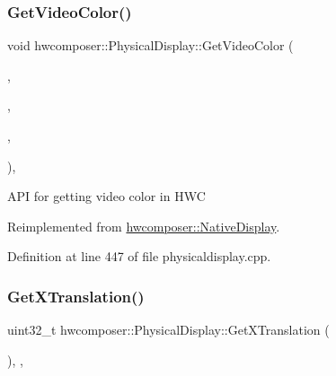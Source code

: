 \subsubsection{\texorpdfstring{Get\+Video\+Color()}{GetVideoColor()}}
{\footnotesize\ttfamily void hwcomposer\+::\+Physical\+Display\+::\+Get\+Video\+Color (\begin{DoxyParamCaption}\item[{H\+W\+C\+Color\+Control}]{,  }\item[{float $\ast$}]{,  }\item[{float $\ast$}]{,  }\item[{float $\ast$}]{ }\end{DoxyParamCaption})\hspace{0.3cm}{\ttfamily [override]}, {\ttfamily [virtual]}}

A\+PI for getting video color in H\+WC 

Reimplemented from \mbox{\hyperlink{classhwcomposer_1_1NativeDisplay_a2db52a8a234064113a0e250a059663ac}{hwcomposer\+::\+Native\+Display}}.



Definition at line 447 of file physicaldisplay.\+cpp.


\begin{DoxyCode}{0}
\end{DoxyCode}
\mbox{\label{classhwcomposer_1_1PhysicalDisplay_a6ed8f896bdb7adc6a20bf25c3fe41f8f}} 
\subsubsection{\texorpdfstring{Get\+X\+Translation()}{GetXTranslation()}}
{\footnotesize\ttfamily uint32\+\_\+t hwcomposer\+::\+Physical\+Display\+::\+Get\+X\+Translation (\begin{DoxyParamCaption}{ }\end{DoxyParamCaption})\hspace{0.3cm}{\ttfamily [inline]}, {\ttfamily [override]}, {\ttfamily [virtual]}}

